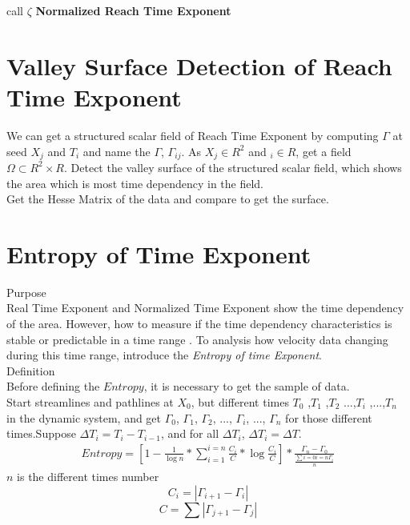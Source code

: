 \documentclass[
     11pt,         %
     a4paper,      %
     oneside,
     ]{article}
\begin{document}
call $\zeta$ \textbf{Normalized Reach Time Exponent}

\section{Valley Surface Detection of Reach Time Exponent}
We can get a structured scalar field of Reach Time Exponent by computing $\Gamma$ at seed $X_{j}$ and $T_{i}$ and name the $\Gamma$, $\Gamma_{ij}$. As $X_{j}\in R^{2}$ and $_{i} \in R$, get a field $\Omega \subset R^{2}\times R$. Detect the valley surface of the structured scalar field, which shows the area which is most time dependency in the field.\\
Get the Hesse Matrix of the data and compare to get the surface.


\section{Entropy of Time Exponent}


 Purpose\\
	Real Time Exponent and Normalized Time Exponent show the time dependency of the area. However, how to measure if the time dependency characteristics is stable or predictable in a time range .
	To analysis how velocity data changing during this time range, introduce the \textit{Entropy of time Exponent}.\\
 Definition\\
	Before defining the $Entropy$, it is necessary to get the sample of data. \\
	Start streamlines and pathlines at $X_{0}$, but different times $T_{0}$ ,$T_{1}$ ,$T_{2}$ ...,$T_{i}$ ,...,$T_{n}$ in the dynamic system, and get $\Gamma_{0}$, $\Gamma_{1}$, $\Gamma_{2}$, ..., $\Gamma_{i}$, ..., $\Gamma_{n}$ for those different times.Suppose $\Delta T_{i}= T_{i}- T_{i-1}$, and for all $\Delta T_{i}$, $\Delta T_{i}=\Delta T$.
	\begin{eqnarray}
	Entropy=[1-\frac{1}{\log n}*\sum_{i=1}^{i=n}\frac{C_{i}}{C}*\log \frac{C_{i}}{C}]*\frac{\Gamma_{n}-\Gamma_{0}}{\frac{\sum{i=0}{i=n} \Gamma_{i}}{n}}
	\end{eqnarray}
	$n$ is the different times number\\
	$$C_{i}=\left|\Gamma_{i+1}-\Gamma_{i}\right|$$
	$$C=\sum\left|\Gamma_{j+1}-\Gamma_{j}\right|$$
\end{document}

